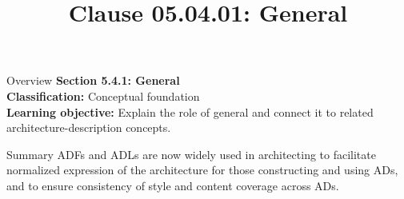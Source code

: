 \documentclass[10pt,letterpaper]{article}
\title{Clause 05.04.01: General}
\author{}
\date{}
\begin{document}
\maketitle
\begin{CornellOverviewBox}{Overview}
{\Large\bfseries\textcolor{CNavy}{Section 5.4.1: General}}\\[3pt]
{\small\textbf{Classification:} Conceptual foundation}\\
{\small\textbf{Learning objective:} Explain the role of general and connect it to related architecture-description concepts.}
\end{CornellOverviewBox}
\vspace{3pt}

\begin{CornellNotesTable}
\end{CornellNotesTable}


\begin{CornellSummaryBox}{Summary}
ADFs and ADLs are now widely used in architecting to facilitate normalized expression of the architecture for those constructing and using ADs, and to ensure consistency of style and content coverage across ADs.
\end{CornellSummaryBox}
\end{document}
